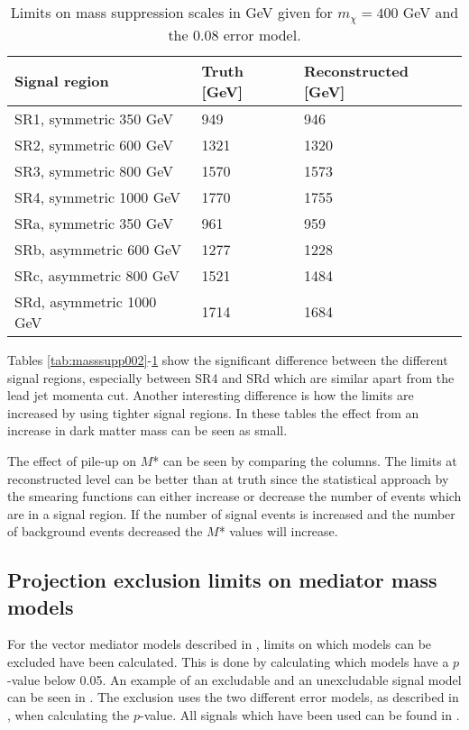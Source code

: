 \begin{table}[ht]
\begin{center}
\begin{tabular}{|l|l|l|}
\hline
Signal region & Truth [GeV]& Reconstructed [GeV]\\ \hline
SR1, symmetric 350 GeV&949&946\\
SR2, symmetric 600 GeV&1321&1320\\
SR3, symmetric 800 GeV&1570&1573\\
SR4, symmetric 1000 GeV&1770&1755\\ \hline

SRa, symmetric 350 GeV&961&959\\
SRb, asymmetric 600 GeV&1277&1228\\
SRc, asymmetric 800 GeV&1521&1484\\
SRd, asymmetric 1000 GeV&1714&1684\\ \hline
\end{tabular}
\caption{Limits on mass suppression scales in GeV given for $m_{\chi}=400$ GeV and the 0.08 error model.}
\label{tab:masssupp2010}
\end{center}
\end{table}

Tables \ref{tab:masssupp002}-\ref{tab:masssupp2010} show the significant difference between the different signal regions, especially between SR4 and SRd which are similar apart from the lead jet momenta cut. Another interesting difference is how the limits are increased by using tighter signal regions. In these tables the effect from an increase in dark matter mass can be seen as small.

The effect of pile-up on $M$* can be seen by comparing the columns. The limits at reconstructed level can be better than at truth since the statistical approach by the smearing functions can either increase or decrease the number of events which are in a signal region. If the number of signal events is increased and the number of background events decreased the $M$* values will increase.

\subsection{Projection exclusion limits on mediator mass models}\label{sec:res:subsec:Mm}
For the vector mediator models described in , limits on which models can be excluded have been calculated. This is done by calculating which models have a $p$-value below 0.05. An example of an excludable and an unexcludable signal model can be seen in . The exclusion uses the two different error models, as described in , when calculating the $p$-value. All signals which have been used can be found in .

